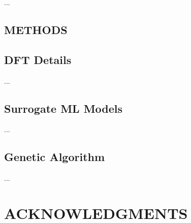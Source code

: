 \documentclass[aip, jmp, amsmath, amssymb, preprint]{revtex4-2}
\begin{document}
... \\



\begin{methods}


\section*{METHODS}


\subsection*{DFT Details}

... \\




\subsection*{Surrogate ML Models}

... \\


\subsection*{Genetic Algorithm}

... \\


\end{methods}




\section*{ACKNOWLEDGMENTS}
\end{document}
